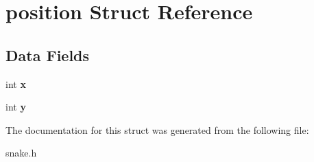 \hypertarget{structposition}{\section{position Struct Reference}
\label{structposition}
}
\subsection*{Data Fields}
\begin{DoxyCompactItemize}
\item 
\hypertarget{structposition_a6150e0515f7202e2fb518f7206ed97dc}{int {\bfseries x}}\label{structposition_a6150e0515f7202e2fb518f7206ed97dc}

\item 
\hypertarget{structposition_a0a2f84ed7838f07779ae24c5a9086d33}{int {\bfseries y}}\label{structposition_a0a2f84ed7838f07779ae24c5a9086d33}

\end{DoxyCompactItemize}


The documentation for this struct was generated from the following file\-:\begin{DoxyCompactItemize}
\item 
snake.\-h\end{DoxyCompactItemize}
